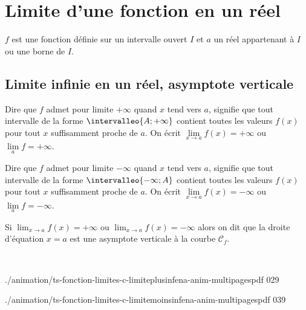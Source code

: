 \section{Limite d'une fonction en un réel}

$f$ est une fonction définie sur un intervalle ouvert $I$ et $a$ un réel appartenant à $I$ ou une borne de $I$.

\subsection{Limite infinie en un réel, asymptote verticale}

\begin{dfn}
Dire que $f$ admet pour limite $+\infty$ quand $x$ tend vers $a$, signifie que tout intervalle de la forme $\intervalleo{A;+\infty}$ contient toutes les valeurs $f(x)$  pour tout $x$ suffisamment proche de $a$.\newline
On écrit $\lim\limits_{x\to a} f(x)=+\infty$ ou $\lim\limits_{a} f=+\infty$.
\end{dfn}

\begin{dfn}
Dire que $f$ admet pour limite $-\infty$ quand $x$ tend vers $a$, signifie que tout intervalle de la forme $\intervalleo{-\infty;A}$ contient toutes les valeurs $f(x)$  pour tout $x$ suffisamment proche de $a$.\newline
On écrit $\lim\limits_{x\to a} f(x)=-\infty$ ou $\lim\limits_{a} f=-\infty$.
\end{dfn}

\begin{dfn}
Si $\displaystyle \lim_{x\to a} f(x)=+\infty$ ou $\displaystyle \lim_{x\to a} f(x)=-\infty$ alors on dit que la droite d'équation $x=a$ est une asymptote verticale à la courbe $\mathcal C_f$.
\end{dfn}
\enlargethispage{\baselineskip}
\begin{intgr}~\newline
   \begin{minipage}{0.47\linewidth}%
%
	{./animation/ts-fonction-limites-c-limiteplusinfena-anim-multipagespdf}%
	{0}{29}
   \end{minipage}
	\hfill
	\begin{minipage}{0.47\linewidth}%
%
	{./animation/ts-fonction-limites-c-limitemoinsinfena-anim-multipagespdf}%
	{0}{39}
   \end{minipage}
\end{intgr}

